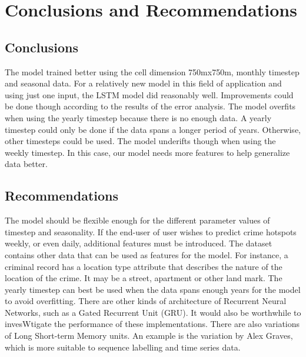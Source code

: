 
\chapter{Conclusions and Recommendations}  %

\section{Conclusions}
    The model trained better using the cell dimension 750mx750m, monthly timestep and seasonal data. For a relatively new model in this field of application and using just one input, the LSTM model did reasonably well. Improvements could be done though according to the results of the error analysis. The model overfits when using the yearly timestep because there is no enough data. A yearly timestep could only be done if the data spans a longer period of years. Otherwise, other timesteps could be used. The model underifts though when using the weekly timestep. In this case, our model needs more features to help generalize data better.
\section{Recommendations}
    The model should be flexible enough for the different parameter values of timestep and seasonality. If the end-user of user wishes to predict crime hotspots weekly, or even daily, additional features must be introduced. The dataset contains other data that can be used as features for the model. For instance, a criminal record has a location type attribute that describes the nature of the location of the crime. It may be a street, apartment or other land mark. The yearly timestep can best be used when the data spans enough years for the model to avoid overfitting.
    There are other kinds of architecture of Recurrent Neural Networks, such as a Gated Recurrent Unit (GRU). It would also be worthwhile to invesWtigate the performance of these implementations.
    There are also variations of Long Short-term Memory units. An example is the variation by Alex Graves, which is more suitable to sequence labelling and time series data.